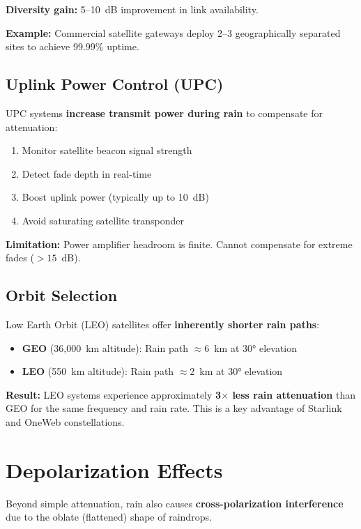 \textbf{Diversity gain:} 5--10~dB improvement in link availability.

\textbf{Example:} Commercial satellite gateways deploy 2--3 geographically separated sites to achieve 99.99\% uptime.

\subsection{Uplink Power Control (UPC)}

UPC systems \textbf{increase transmit power during rain} to compensate for attenuation:

\begin{enumerate}
\item Monitor satellite beacon signal strength
\item Detect fade depth in real-time
\item Boost uplink power (typically up to 10~dB)
\item Avoid saturating satellite transponder
\end{enumerate}

\textbf{Limitation:} Power amplifier headroom is finite. Cannot compensate for extreme fades ($> 15$~dB).

\subsection{Orbit Selection}

Low Earth Orbit (LEO) satellites offer \textbf{inherently shorter rain paths}:

\begin{itemize}
\item \textbf{GEO} (36,000~km altitude): Rain path $\approx 6$~km at 30° elevation
\item \textbf{LEO} (550~km altitude): Rain path $\approx 2$~km at 30° elevation
\end{itemize}

\textbf{Result:} LEO systems experience approximately \textbf{3$\times$ less rain attenuation} than GEO for the same frequency and rain rate. This is a key advantage of Starlink and OneWeb constellations.

\section{Depolarization Effects}

Beyond simple attenuation, rain also causes \textbf{cross-polarization interference} due to the oblate (flattened) shape of raindrops.

